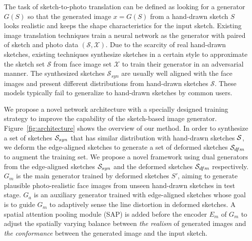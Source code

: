 % 

The task of sketch-to-photo translation can be defined as looking for a generator $G(S)$ so that the generated image $x=G(S)$ from a hand-drawn sketch $S$ looks realistic and keeps the shape characteristics for the input sketch.
%
Existing image translation techniques train a neural network as the generator with paired of sketch and photo data $(\mathcal{S}, \mathcal{X})$.
%
Due to the scarcity of real hand-drawn sketches, existing techniques synthesize sketches in a certain style to approximate the sketch set $\mathcal{S}$ from face image set $\mathcal{X}$ to train their generator in an adversarial manner.
The synthesized sketches $\mathcal{S}_{syn}$ are usually well aligned with the face images and present different distributions from hand-drawn sketches $\mathcal{S}$.
These models typically fail to generalize to hand-drawn sketches by common users. 
%


We propose a novel network architecture with a specially designed training strategy to improve the capability of the sketch-based image generator.
%
Figure~\ref{fig:architecture} shows the overview of our method.
%
In order to synthesize a set of sketches $\mathcal{S}_{syn}$ that has similar distribution with hand-drawn sketches $\mathcal{S}$, we deform the edge-aligned sketches to generate a set of deformed sketches $\mathcal{S}_{dfm}$ to augment the training set.
We propose a novel framework using dual generators from the edge-aligned sketches $\mathcal{S}_{syn}$ and the deformed sketches $\mathcal{S}_{dfm}$ respectively.
%
$G_m$ is the main generator trained by deformed sketches $S'$, aiming to generate plausible photo-realistic face images from unseen hand-drawn sketches in test stage. 
$G_a$ is an auxiliary generator trained with edge-aligned sketches whose goal is to guide $G_m$ to adaptively sense the line distortion in deformed sketches.
%
A spatial attention pooling module (SAP) is added before the encoder $E_m$ of $G_m$ to adjust the spatially varying balance between \textit{the realism} of generated images and \textit{the conformance} between the generated image and the input sketch. 
%

